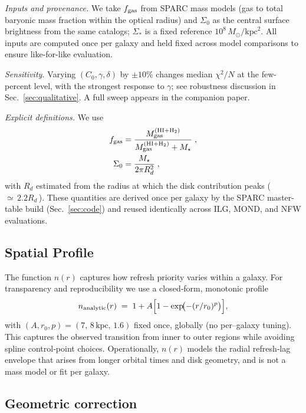 \documentclass[twocolumn,prd,amsmath,amssymb,aps,superscriptaddress,nofootinbib]{revtex4-2}
\begin{document}
\noindent\textit{Inputs and provenance.} We take $f_{\rm gas}$ from SPARC mass models (gas to total baryonic mass fraction within the optical radius) and $\Sigma_0$ as the central surface brightness from the same catalogs; $\Sigma_*$ is a fixed reference $10^8\,M_\odot/\mathrm{kpc}^2$. All inputs are computed once per galaxy and held fixed across model comparisons to ensure like-for-like evaluation.

\noindent\textit{Sensitivity.} Varying $(C_0,\gamma,\delta)$ by $\pm10\%$ changes median $\chi^2/N$ at the few-percent level, with the strongest response to $\gamma$; see robustness discussion in Sec.~\ref{sec:qualitative}. A full sweep appears in the companion paper.

\noindent\textit{Explicit definitions.} We use
\begin{align}
  f_{\rm gas} &= \frac{M_{\rm gas}^{\rm (HI+H_2)}}{M_{\rm gas}^{\rm (HI+H_2)} + M_\star}\;,\\
  \Sigma_0 &= \frac{M_\star}{2\pi R_d^2}\;,
\end{align}
with $R_d$ estimated from the radius at which the disk contribution peaks (\,$\simeq\,2.2 R_d$\,). These quantities are derived once per galaxy by the SPARC master-table build (Sec.~\ref{sec:code}) and reused identically across ILG, MOND, and NFW evaluations.

\subsection{Spatial Profile}

The function $n(r)$ captures how refresh priority varies within a galaxy. For transparency and reproducibility we use a closed‑form, monotonic profile
\begin{equation}
  n_{\mathrm{analytic}}(r)\;=\;1 + A\Bigl[1 - \exp\!\bigl(-(r/r_0)^p\bigr)\Bigr],
  \label{eq:n-analytic}
\end{equation}
with $(A, r_0, p) = (7,\,8\,\mathrm{kpc},\,1.6)$ fixed once, globally (no per–galaxy tuning). This captures the observed transition from inner to outer regions while avoiding spline control‑point choices.
Operationally, $n(r)$ models the radial refresh‑lag envelope that arises from longer orbital times and disk geometry, and is not a mass model or fit per galaxy.

\subsection{Geometric correction}
\label{sec:zeta}
\end{document}
